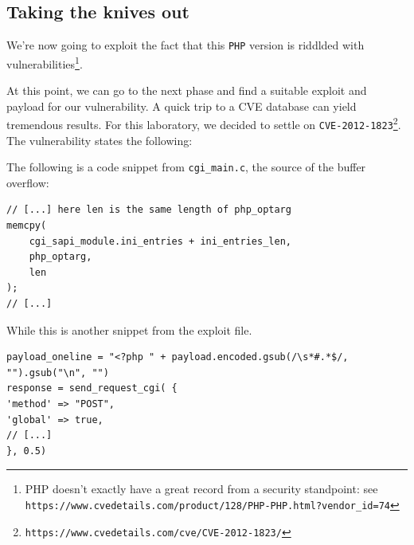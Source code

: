 
\subsection{Taking the knives out}
\label{subsec:ex2:taking-knives-out}

We're now going to exploit the fact that this \texttt{PHP} version is riddlded with vulnerabilities\footnote{PHP doesn't exactly have a great record from a security standpoint: see\\\texttt{https://www.cvedetails.com/product/128/PHP-PHP.html?vendor\_id=74}}. 

At this point, we can go to the next phase and find a suitable exploit and payload for our vulnerability. A quick trip to a CVE database can yield tremendous results. For this laboratory, we decided to settle on \texttt{CVE-2012-1823}\footnote{\texttt{https://www.cvedetails.com/cve/CVE-2012-1823/}}. The vulnerability states the following:

\medskip

\begin{center}
\noindent{}
\end{center}

\medskip


{
\noindent
\begin{minipage}{\linewidth}

The following is a code snippet from \texttt{cgi\_main.c}, the source of the buffer overflow:

\begin{lstlisting}[showspaces=false,breaklines=true]
// [...] here len is the same length of php_optarg
memcpy(
    cgi_sapi_module.ini_entries + ini_entries_len,
    php_optarg,
    len
);
// [...]
\end{lstlisting}
\end{minipage}
}

{
\noindent
\begin{minipage}{\linewidth}

While this is another snippet from the exploit file.

\begin{lstlisting}
payload_oneline = "<?php " + payload.encoded.gsub(/\s*#.*$/, "").gsub("\n", "")
response = send_request_cgi( {
'method' => "POST",
'global' => true,
// [...]
}, 0.5)
\end{lstlisting}
\end{minipage}
}

